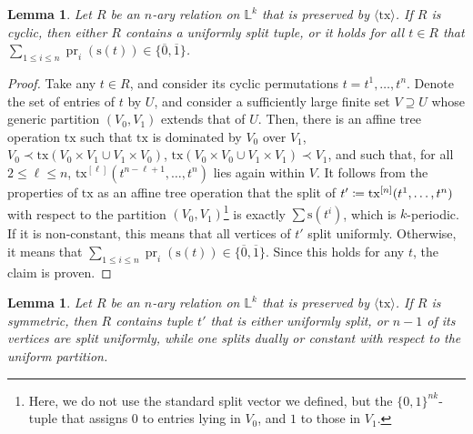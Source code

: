 \documentclass[a4paper,reqno, cleveref]{amsart}
\newcommand{\coloneqq}{\mathrel{\mathop:}\mathrel{\mkern-1.2mu}=}
\newtheorem{lemma}[theorem]{Lemma}
\newcommand{\s}{\ensuremath{\mathrm{s}}\xspace}
\DeclareMathOperator{\pr}{pr}
\newcommand{\sL}{\mathbb L}
\newcommand{\nested}[2]{{#1^{[#2]}}}
\newcommand{\gen}[1]{\langle#1\rangle}
\newcommand{\tx}{\ensuremath{\mathrm{tx}}\xspace}
\newcommand{\hyp}{\ensuremath{R}\xspace}
\begin{document}
\begin{lemma}\label{phylo:lemma:hyp:parity}
    Let $\hyp$ be an $n$-ary relation on $\sL^k$ that is preserved by $\gen{\tx}$.
    If $\hyp$ is cyclic, then either $\hyp$ contains a uniformly split tuple, or it holds for all $t\in \hyp$ that $\sum_{1\leq i\leq n}\pr_i(\s(t))\in\{\overline 0,\overline 1\}$.
\end{lemma}
%
\begin{proof}
    Take any $t\in \hyp$, and consider its cyclic permutations $t=t^1,\ldots,t^n$. 
    Denote the set of entries of $t$ by $U$, and consider a sufficiently large finite set $V\supseteq U$ whose generic partition $(V_0,V_1)$ extends that of $U$.
    Then, there is an affine tree operation $\tx$ such that $\tx$ is dominated by $V_0$ over $V_1$, 
    $V_0\prec\tx(V_0\times V_1\cup V_1\times V_0)$,
    $\tx(V_0\times V_0\cup V_1\times V_1)\prec V_1$,
    and such that, for all $2\leq\ell\leq n$, $\nested{\tx}{\ell}(t^{n-\ell+1},\ldots,t^n)$ lies again within $V$.
    It follows from the properties of $\tx$ as an affine tree operation that the split of $t'\coloneqq\nested{\tx}{n}(t^1,\ldots,t^n)$ with respect to the partition $(V_0,V_1)$\footnote{Here, we do not use the standard split vector we defined, but the $\{0,1\}^{nk}$-tuple that assigns $0$ to entries lying in $V_0$, and $1$ to those in $V_1$.} is exactly $\sum \s(t^i)$, which is $k$-periodic. 
    If it is non-constant, this means that all vertices of $t'$ split uniformly.
    Otherwise, it means that $\sum_{1\leq i\leq n}\pr_i(\s(t))\in\{\overline 0,\overline 1\}$.
    Since this holds for any $t$, the claim is proven.
\end{proof}

\begin{lemma}\label{phylo:lemma:hyp:symmetric}
    Let $\hyp$ be an $n$-ary relation on $\sL^k$ that is preserved by $\gen{\tx}$.
    If $\hyp$ is symmetric, then $\hyp$ contains tuple $t'$ that is either uniformly split, or $n-1$ of its vertices are split uniformly, while one splits dually or constant with respect to the uniform partition.
\end{lemma}
\end{document}
